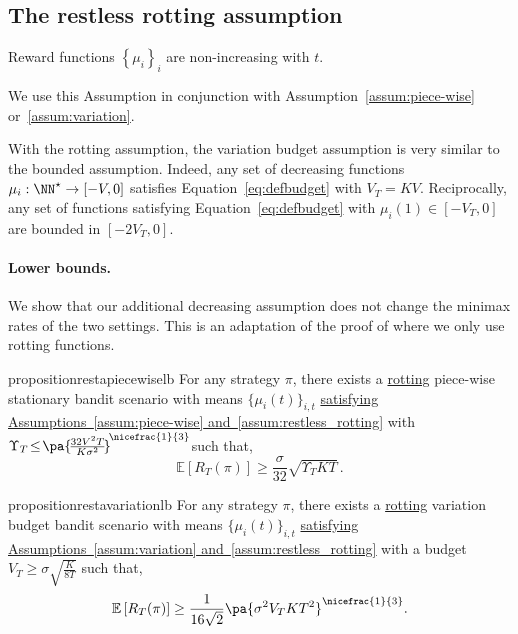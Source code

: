 \subsection{The restless rotting assumption}
\label{subsec:restless-rotting}
\begin{assumption}
\label{assum:restless_rotting}
Reward functions $\left\{\mu_i \right\}_i$ are non-increasing with $t$.
\end{assumption}
We use this Assumption in conjunction with Assumption~\ref{assum:piece-wise} or~\ref{assum:variation}.
\begin{remark}
\label{remark:budget}
With the rotting assumption, the variation budget assumption is very similar to the bounded assumption. Indeed, any set of decreasing functions $\mu_i : \NN^\star \rightarrow [- V, 0]$ satisfies Equation~\ref{eq:defbudget} with $V_T = KV$. Reciprocally, any set of functions satisfying Equation~\ref{eq:defbudget} with $\mu_i(1) \in [- V_T, 0]$ are bounded in $[- 2V_T, 0]$. 
\end{remark}

\paragraph{Lower bounds.} We show that our additional decreasing assumption does not change the minimax rates of the two settings. This is an adaptation of the proof of \citet{besbes2014stochastic} where we only use rotting functions.

\begin{restatable}{proposition}{restapiecewiselb}
\label{prop:piecewise_lb2}
For any strategy $\pi$, there exists a \underline{rotting} piece-wise stationary bandit scenario with means $\{\mu_i(t)\}_{i,t}$ \underline{satisfying Assumptions~\ref{assum:piece-wise} and~\ref{assum:restless_rotting}} with $\Upsilon_T\! \leq \!\pa{\!\frac{32V^2T }{K\sigma^2}\!}^{\!\nicefrac{1}{3}\!}\!$ such that,
\[
    \mathbb{E}\left[R_T(\pi)\right] \geq \frac{\sigma}{32}\sqrt{ \Upsilon_T KT}\,.
\]
\end{restatable}
\begin{restatable}{proposition}{restavariationlb}
\label{prop:variation_lb2}
For any strategy $\pi$, there exists a \underline{rotting} variation budget bandit scenario with means $\{\mu_i(t)\}_{i,t}$ \underline{satisfying Assumptions~\ref{assum:variation} and~\ref{assum:restless_rotting}} with a budget $V_T \geq \sigma \sqrt{\frac{K}{8T}}$ such that,
%
\[
    \mathbb{E}\left[R_T(\pi)\right] \geq \frac{1}{16\sqrt{2}} \pa{\sigma^2 V_T KT^2}^{\nicefrac{1}{3}}.
\]
\end{restatable}

